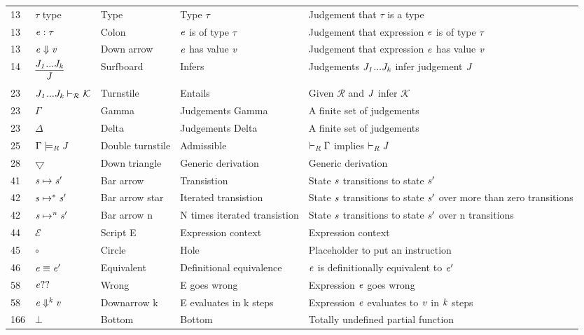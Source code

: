 \documentclass[12pt]{article}
\begin{document}
\begin{tabular}[b] {p{} p{} p{} p{} p{}}
13& $\tau$ type& Type & Type $\tau$ & Judgement that $\tau$ is a type \\
13& $\it{e} : \tau$ & Colon &  $\it{e}$ is of type $\tau$ & Judgement that expression $\it{e}$ is of type $\tau$ \\
13& $\it{e} \Downarrow \it{v}$ & Down arrow &  $\it{e}$ has value $\it{v} $ & Judgement that expression $\it{e}$ has value $\it{v} $\\
14& $\infer {\it{J}} {\it{J}_{1}...\it{J}_{\it{k}}}$  & Surfboard & Infers & Judgements ${\it{J}_{1}...\it{J}_{\it{k}}}$ infer judgement ${\it{J}}$\\
23 & ${\it{J}_{1}...\it{J}_{\it{k}}} \vdash_{\mathcal{R}} \mathcal{K}$ & Turnstile & Entails & Given $\mathcal{R}$ and $\it{J}$ infer $\mathcal{K}$\\
23 & $\Gamma$ & Gamma & Judgements Gamma & A finite set of judgements \\
23 & $\Delta$ & Delta & Judgements Delta & A finite set of judgements \\
25 & $\Gamma \models_{\it{R}} \it{J}$ & Double turnstile & Admissible & $\vdash_{\it{R}} \Gamma$ implies $\vdash_{\it{R}} \it{J}$ \\
28 & $\bigtriangledown$ & Down triangle & Generic derivation & Generic derivation \\
41 & $\it{s} \mapsto \it{s'}$ & Bar arrow & Transistion  & State $\it{s}$ transitions to state $\it{s'}$ \\

42 & $\it{s} \mapsto ^{*} \it{s'}$ & Bar arrow star & Iterated transistion  & State $\it{s}$ transitions to state $\it{s'}$ over more than zero transitions \\

42 & $\it{s} \mapsto ^{n} \it{s'}$ & Bar arrow n & N times iterated transistion  & State $\it{s}$ transitions to state $\it{s'}$ over n transitions \\

44 & $\mathcal{E}$  & Script E & Expression context & Expression context \\

45 & $\circ $ & Circle & Hole & Placeholder to put an instruction \\
46 & $ \it{e} \equiv \it{e}' $ & Equivalent & Definitional equivalence & $\it{e}$ is definitionally equivalent to $\it{e}'$ \\

58 & $\it{e}??$ & Wrong & E goes wrong & Expression $\it{e}$ goes wrong \\

58 & $\it{e} \Downarrow ^{\it{k}}\it{v}$  & Downarrow k & E evaluates in k steps & Expression $ \it{e}$ evaluates to $\it{v}$ in $\it{k}$ steps\\

166 &$ \bot$ & Bottom & Bottom & Totally undefined partial function \\
\end{tabular}
\end{document}
